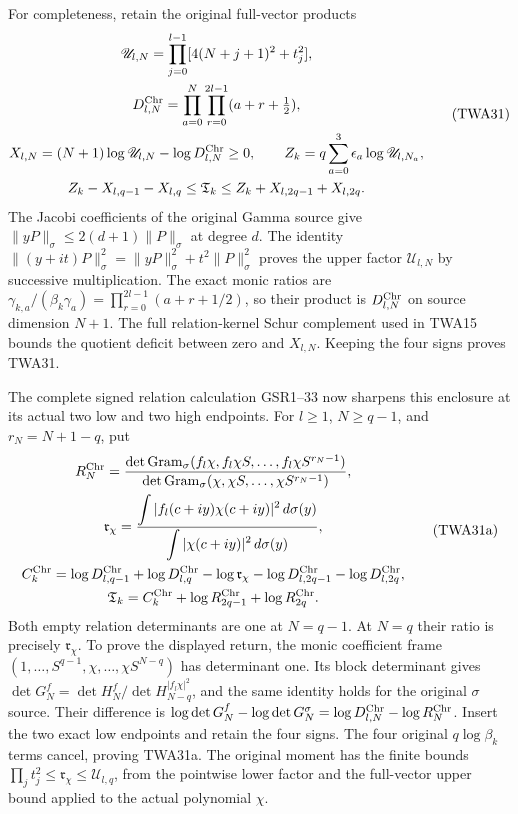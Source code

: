 For completeness, retain the original full-vector products
\[
\begin{gathered}
 \mathscr U_{l,N}=\prod_{j=0}^{l-1}[4(N+j+1)^2+t_j^2],\\
 D_{l,N}^{\rm Chr}=\prod_{a=0}^{N}\prod_{r=0}^{2l-1}
                              (a+r+\tfrac12),\\
 X_{l,N}=(N+1)\log\mathscr U_{l,N}-\log D_{l,N}^{\rm Chr}\geq0,
 \qquad Z_k=q\sum_{a=0}^3\epsilon_a\log\mathscr U_{l,N_a},\\
 Z_k-X_{l,q-1}-X_{l,q}\leq\mathfrak T_k
       \leq Z_k+X_{l,2q-1}+X_{l,2q}.
\end{gathered}\tag{TWA31}
\]
The Jacobi coefficients of the original Gamma source give
$\|yP\|_\sigma\leq2(d+1)\|P\|_\sigma$ at degree $d$.
The identity $\|(y+it)P\|_\sigma^2
=\|yP\|_\sigma^2+t^2\|P\|_\sigma^2$ proves the upper
factor $\mathscr U_{l,N}$ by successive multiplication.
The exact monic ratios are
$\gamma_{k,a}/(\beta_k\gamma_a)=\prod_{r=0}^{2l-1}(a+r+1/2)$,
so their product is $D_{l,N}^{\rm Chr}$ on source dimension
$N+1$. The full relation-kernel Schur complement used in TWA15
bounds the quotient deficit between zero and $X_{l,N}$.
Keeping the four signs proves TWA31.

The complete signed relation calculation GSR1--33 now sharpens
this enclosure at its actual two low and two high endpoints.
For $l\geq1$, $N\geq q-1$, and $r_N=N+1-q$, put
\[
\begin{gathered}
 R_N^{\rm Chr}
 =\frac{\det\operatorname{Gram}_\sigma
         (f_l\chi,f_l\chi S,\ldots,f_l\chi S^{r_N-1})}
        {\det\operatorname{Gram}_\sigma
         (\chi,\chi S,\ldots,\chi S^{r_N-1})},\\
 \mathfrak r_\chi
 =\frac{\displaystyle\int|f_l(c+iy)\chi(c+iy)|^2\,d\sigma(y)}
        {\displaystyle\int|\chi(c+iy)|^2\,d\sigma(y)},\\
 C_k^{\rm Chr}=\log D_{l,q-1}^{\rm Chr}+\log D_{l,q}^{\rm Chr}
 -\log\mathfrak r_\chi
 -\log D_{l,2q-1}^{\rm Chr}-\log D_{l,2q}^{\rm Chr},\\
 \mathfrak T_k=C_k^{\rm Chr}
                 +\log R_{2q-1}^{\rm Chr}+\log R_{2q}^{\rm Chr}.
\end{gathered}\tag{TWA31a}
\]
Both empty relation determinants are one at $N=q-1$.
At $N=q$ their ratio is precisely $\mathfrak r_\chi$.
To prove the displayed return, the monic coefficient frame
$(1,\ldots,S^{q-1},\chi,\ldots,\chi S^{N-q})$
has determinant one. Its block determinant gives
$\det G_N^f=\det H_N^f/\det H_{N-q}^{|f_l\chi|^2}$,
and the same identity holds for the original $\sigma$ source.
Their difference is
$\log\det G_N^f-\log\det G_N^\sigma
=\log D_{l,N}^{\rm Chr}-\log R_N^{\rm Chr}$.
Insert the two exact low endpoints and retain the four signs.
The four original $q\log\beta_k$ terms cancel, proving TWA31a.
The original moment has the finite bounds
$\prod_jt_j^2\leq\mathfrak r_\chi\leq\mathscr U_{l,q}$,
from the pointwise lower factor and the full-vector upper
bound applied to the actual polynomial $\chi$.

